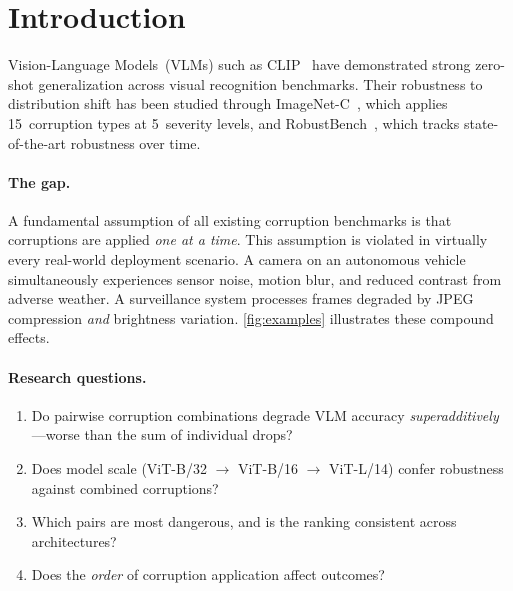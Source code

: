 \documentclass[10pt, twocolumn]{article}
\begin{document}
\section{Introduction}
\label{sec:intro}

Vision-Language Models~(VLMs) such as CLIP~\cite{radford2021clip}
have demonstrated strong zero-shot generalization across visual
recognition benchmarks.
Their robustness to distribution shift has been studied through
ImageNet-C~\cite{hendrycks2019benchmarking}, which applies
15~corruption types at 5~severity levels, and
RobustBench~\cite{croce2021robustbench}, which tracks
state-of-the-art robustness over time.

\paragraph{The gap.}
A fundamental assumption of all existing corruption benchmarks is
that corruptions are applied \emph{one at a time}.
This assumption is violated in virtually every real-world
deployment scenario.
A camera on an autonomous vehicle simultaneously experiences
sensor noise, motion blur, and reduced contrast from adverse
weather.
A surveillance system processes frames degraded by JPEG
compression \emph{and} brightness variation.
\cref{fig:examples} illustrates these compound effects.

\paragraph{Research questions.}
\begin{enumerate}[leftmargin=*, label=\textbf{RQ\arabic*.}]
  \item Do pairwise corruption combinations degrade VLM accuracy
        \emph{superadditively}---worse than the sum of individual
        drops?
  \item Does model scale (ViT-B/32 $\to$ ViT-B/16 $\to$
        ViT-L/14) confer robustness against combined corruptions?
  \item Which pairs are most dangerous, and is the ranking
        consistent across architectures?
  \item Does the \emph{order} of corruption application affect
        outcomes?
\end{enumerate}
\end{document}
